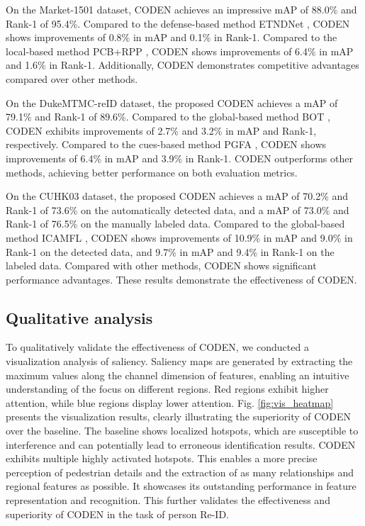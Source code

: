 \documentclass[12pt]{spieman}  %
\begin{document}
\begin{spacing}{2}
On the Market-1501 dataset, CODEN achieves an impressive mAP of 88.0\% and Rank-1 of 95.4\%. Compared to the defense-based method ETNDNet  \cite{dong2023erasing}, CODEN shows improvements of 0.8\% in mAP and 0.1\% in Rank-1. Compared to the local-based method PCB+RPP \cite{sun2018beyond}, CODEN shows improvements of 6.4\% in mAP and 1.6\% in Rank-1. Additionally, CODEN demonstrates competitive advantages compared over other methods.

On the DukeMTMC-reID dataset, the proposed CODEN achieves a mAP of 79.1\% and Rank-1 of 89.6\%. Compared to the global-based method BOT \cite{luo2019bag}, CODEN exhibits improvements of 2.7\% and 3.2\% in mAP and Rank-1, respectively. Compared to the cues-based method PGFA \cite{miao2019pose}, CODEN shows improvements of 6.4\% in mAP and 3.9\% in Rank-1. CODEN outperforms other methods, achieving better performance on both evaluation metrics.

On the CUHK03 dataset, the proposed CODEN achieves a mAP of 70.2\% and Rank-1 of 73.6\% on the automatically detected data, and a mAP of 73.0\% and Rank-1 of 76.5\% on the manually labeled data. Compared to the global-based method ICAMFL \cite{wang2023information}, CODEN shows improvements of 10.9\% in mAP and 9.0\% in Rank-1 on the detected data, and 9.7\% in mAP and 9.4\% in Rank-1 on the labeled data. Compared with other methods, CODEN shows significant performance advantages. These results demonstrate the effectiveness of CODEN.

\subsection{Qualitative analysis}
To qualitatively validate the effectiveness of CODEN, we conducted a visualization analysis of saliency. Saliency maps are generated by extracting the maximum values along the channel dimension of features, enabling an intuitive understanding of the focus on different regions. Red regions exhibit higher attention, while blue regions display lower attention. Fig. \ref{fig:vis_heatmap} presents the visualization results, clearly illustrating the superiority of CODEN over the baseline. The baseline shows localized hotspots, which are susceptible to interference and can potentially lead to erroneous identification results. CODEN exhibits multiple highly activated hotspots. This enables a more precise perception of pedestrian details and the extraction of as many relationships and regional features as possible. It showcases its outstanding performance in feature representation and recognition. This further validates the effectiveness and superiority of CODEN in the task of person Re-ID.


\end{spacing}
\end{document}
